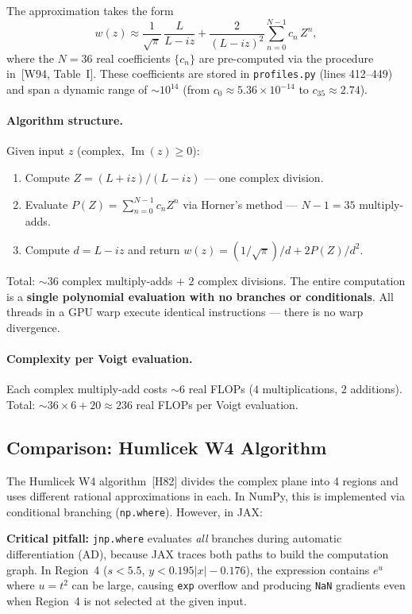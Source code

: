\documentclass[11pt]{article}
\newcommand{\wfn}{w}  %
\newcommand{\im}{\operatorname{Im}}
\begin{document}
The approximation takes the form
\begin{equation}
  \boxed{\wfn(z) \approx \frac{1}{\sqrt{\pi}}\,\frac{L}{L - iz}
    + \frac{2}{(L - iz)^2} \sum_{n=0}^{N-1} c_n\,Z^n,}
  \label{eq:weideman_approx}
\end{equation}
where the $N = 36$ real coefficients $\{c_n\}$ are pre-computed via the procedure
in~[W94, Table~I]. These coefficients are stored in
\texttt{profiles.py} (lines 412--449) and span a dynamic range of
$\sim 10^{14}$ (from $c_0 \approx 5.36 \times 10^{-14}$ to $c_{35} \approx 2.74$).

\paragraph{Algorithm structure.}
Given input $z$ (complex, $\im(z) \geq 0$):
\begin{enumerate}
  \item Compute $Z = (L + iz)/(L - iz)$ --- one complex division.
  \item Evaluate $P(Z) = \sum_{n=0}^{N-1} c_n Z^n$ via Horner's method --- $N-1 = 35$ multiply-adds.
  \item Compute $d = L - iz$ and return $\wfn(z) = (1/\sqrt{\pi})/d + 2P(Z)/d^2$.
\end{enumerate}
Total: $\sim 36$ complex multiply-adds $+$ 2 complex divisions. The entire computation
is a \textbf{single polynomial evaluation with no branches or conditionals}.
All threads in a GPU warp execute identical instructions --- there is no warp divergence.

\paragraph{Complexity per Voigt evaluation.}
Each complex multiply-add costs $\sim 6$ real FLOPs ($4$ multiplications, $2$ additions).
Total: $\sim 36 \times 6 + 20 \approx 236$ real FLOPs per Voigt evaluation.


\subsection{Comparison: Humlicek W4 Algorithm}
\label{sec:humlicek}

The Humlicek W4 algorithm~[H82] divides the complex plane into 4 regions and uses
different rational approximations in each. In NumPy, this is implemented via
conditional branching (\texttt{np.where}). However, in JAX:

\textbf{Critical pitfall:} \texttt{jnp.where} evaluates \emph{all} branches during
automatic differentiation (AD), because JAX traces both paths to build the computation
graph. In Region~4 ($s < 5.5$, $y < 0.195|x| - 0.176$), the expression contains
$e^{u}$ where $u = t^2$ can be large, causing \texttt{exp} overflow and producing
\texttt{NaN} gradients even when Region~4 is not selected at the given input.
\end{document}
